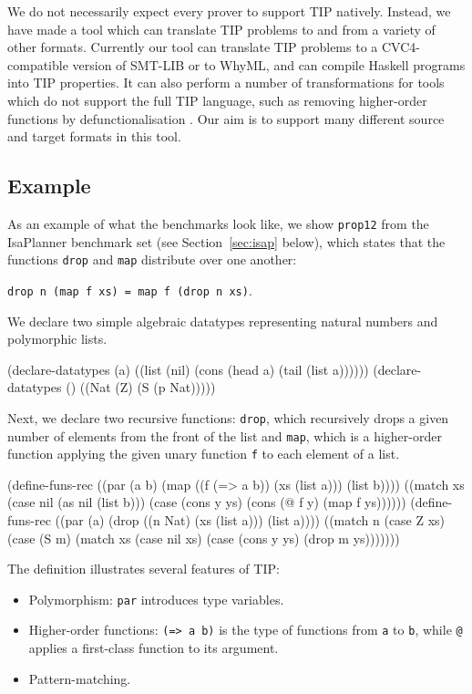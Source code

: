 \documentclass{llncs}
\begin{document}
We do not necessarily expect every prover to support TIP 
natively. Instead, we have made a tool which can translate 
TIP problems to and from a variety of other formats. Currently 
our tool can translate TIP problems to a CVC4-compatible version 
of SMT-LIB or to WhyML, and can compile Haskell programs into 
TIP properties. It can also perform a number of transformations 
for tools which do not support the full TIP language, such as 
removing higher-order functions by defunctionalisation 
\cite{defunc}. Our aim is to support many different source and
target formats in this tool.

\subsection*{Example}
As an example of what the benchmarks look like, we show 
\texttt{prop12} from the IsaPlanner benchmark set (see 
Section~\ref{sec:isap} below), which states that the functions 
\texttt{drop} and \texttt{map} distribute over one another: 
\begin{center}
\texttt{drop n (map f xs) = map f (drop n xs)}.
\end{center}
We declare two simple algebraic datatypes representing natural 
numbers and polymorphic lists.

\begin{code}
(declare-datatypes (a)
  ((list (nil) (cons (head a) (tail (list a))))))
(declare-datatypes () ((Nat (Z) (S (p Nat)))))
\end{code}

Next, we declare two recursive functions: \texttt{drop}, which 
recursively drops a given number of elements from the front of 
the list and \texttt{map}, which is a higher-order function 
applying the given unary function \texttt{f} to each element of 
a list.

\begin{code}
(define-funs-rec
  ((par (a b) (map ((f (=> a b)) (xs (list a))) (list b))))
  ((match xs
     (case nil (as nil (list b)))
     (case (cons y ys) (cons (@ f y) (map f ys))))))
(define-funs-rec
  ((par (a) (drop ((n Nat) (xs (list a))) (list a))))
  ((match n
     (case Z xs)
     (case (S m)
       (match xs
         (case nil xs)
         (case (cons y ys) (drop m ys)))))))
\end{code}

The definition illustrates several features of TIP:
\begin{itemize}
  \item Polymorphism: \verb|par| introduces type variables.
  \item Higher-order functions: \verb|(=> a b)| is the type of
    functions from \verb|a| to \verb|b|, while \verb|@| applies
    a first-class function to its argument.
  \item Pattern-matching.
\end{itemize}
\end{document}
